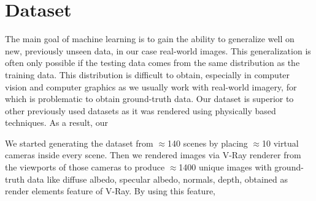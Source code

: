 \chapter{Dataset}
\label{kap:dataset}
The main goal of machine learning is to gain the ability to generalize well on new, previously unseen data, in our case real-world images. This generalization is often only possible if the testing data comes from the same distribution as the training data. This distribution is difficult to obtain, especially in computer vision and computer graphics as we usually work with real-world imagery, for which is problematic to obtain ground-truth data.
\newline
Our dataset is superior to other previously used datasets as it was rendered using physically based techniques. As a result, our 



We started generating the dataset from $\approx$140 scenes by placing $\approx$10 virtual cameras inside every scene. Then we rendered images via V-Ray renderer\cite{V-Ray} from the viewports of those cameras to produce $\approx$1400 unique images with ground-truth data like diffuse albedo, specular albedo, normals, depth, obtained as render elements feature of V-Ray\cite{V-Ray-Render-elements}. By using this feature,